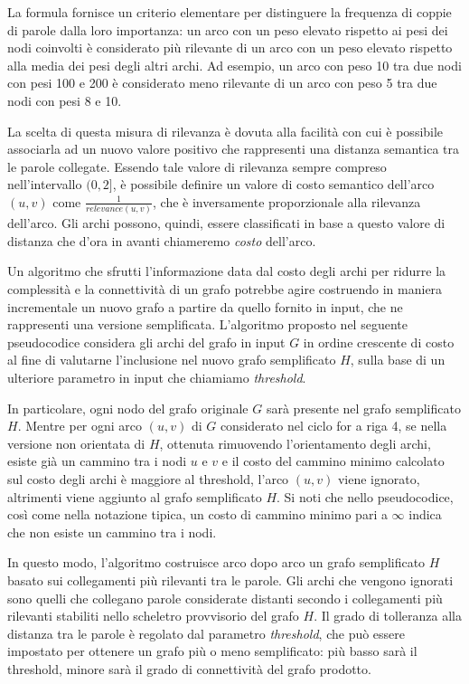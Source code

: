 La formula fornisce un criterio elementare per distinguere la frequenza di coppie di parole dalla loro importanza:
un arco con un peso elevato rispetto ai pesi dei nodi coinvolti è considerato più rilevante di un arco con un peso
elevato rispetto alla media dei pesi degli altri archi.
Ad esempio, un arco con peso 10 tra due nodi con pesi 100 e 200 è considerato meno rilevante di un arco con peso 5
tra due nodi con pesi 8 e 10. \newline

La scelta di questa misura di rilevanza è dovuta alla facilità con cui è possibile associarla ad un nuovo valore
positivo che rappresenti una distanza semantica tra le parole collegate.
Essendo tale valore di rilevanza sempre compreso nell'intervallo $(0, 2]$, è possibile definire un valore di costo
semantico dell'arco $(u, v)$ come $\frac{1}{relevance(u, v)}$, che è inversamente proporzionale alla
rilevanza dell'arco.
Gli archi possono, quindi, essere classificati in base a questo valore di distanza che d'ora in avanti chiameremo
\textit{costo} dell'arco.


Un algoritmo che sfrutti l'informazione data dal costo degli archi per ridurre la complessità e la connettività
di un grafo potrebbe agire costruendo in maniera incrementale un nuovo grafo a partire da quello fornito in input,
che ne rappresenti una versione semplificata.
L'algoritmo proposto nel seguente pseudocodice considera gli archi del grafo in input $G$ in ordine crescente di
costo al fine di valutarne l'inclusione nel nuovo grafo semplificato $H$, sulla base di un ulteriore parametro in input
che chiamiamo \textit{threshold}.

In particolare, ogni nodo del grafo originale $G$ sarà presente nel grafo semplificato $H$. Mentre per ogni arco $(u, v)$
di $G$ considerato nel ciclo for a riga 4, se nella versione non orientata di $H$, ottenuta rimuovendo l'orientamento
degli archi, esiste già un cammino tra i nodi $u$ e $v$ e il costo del cammino minimo calcolato sul costo degli archi
è maggiore al threshold, l'arco $(u, v)$ viene ignorato, altrimenti viene aggiunto al grafo semplificato $H$.
Si noti che nello pseudocodice, così come nella notazione tipica, un costo di cammino minimo pari a $\infty$ indica
che non esiste un cammino tra i nodi.



In questo modo, l'algoritmo costruisce arco dopo arco un grafo semplificato $H$ basato sui collegamenti più
rilevanti tra le parole.
Gli archi che vengono ignorati sono quelli che collegano parole considerate distanti secondo i collegamenti più
rilevanti stabiliti nello scheletro provvisorio del grafo $H$.
Il grado di tolleranza alla distanza tra le parole è regolato dal parametro \textit{threshold},
che può essere impostato per ottenere un grafo più o meno semplificato: più basso sarà il threshold, minore
sarà il grado di connettività del grafo prodotto.

